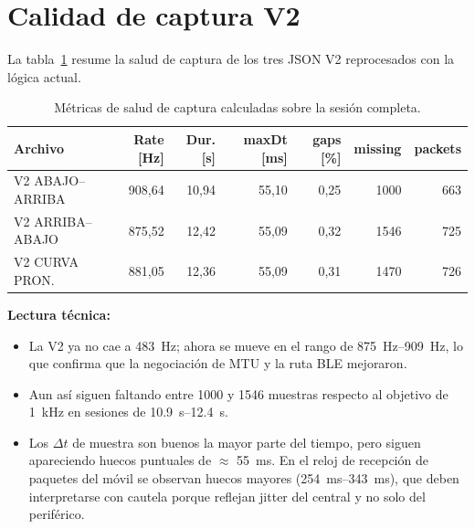 ﻿\documentclass[11pt,a4paper]{article}
\begin{document}
\section{Calidad de captura V2}
La tabla~\ref{tab:capture} resume la salud de captura de los tres JSON V2 reprocesados con la l\'ogica actual.

\begin{table}[h!]
\centering
\small
\begin{tabularx}{\textwidth}{lrrrrrr}
\toprule
Archivo & Rate [Hz] & Dur. [s] & maxDt [ms] & gaps [\%] & missing & packets \\
\midrule
V2 ABAJO--ARRIBA & 908,64 & 10,94 & 55,10 & 0,25 & 1000 & 663 \\
V2 ARRIBA--ABAJO & 875,52 & 12,42 & 55,09 & 0,32 & 1546 & 725 \\
V2 CURVA PRON. & 881,05 & 12,36 & 55,09 & 0,31 & 1470 & 726 \\
\bottomrule
\end{tabularx}
\caption{M\'etricas de salud de captura calculadas sobre la sesi\'on completa.}
\label{tab:capture}
\end{table}

\textbf{Lectura t\'ecnica:}
\begin{itemize}[leftmargin=14pt]
  \item La V2 ya no cae a \SI{483}{Hz}; ahora se mueve en el rango de \SIrange{875}{909}{Hz}, lo que confirma que la negociaci\'on de MTU y la ruta BLE mejoraron.
  \item Aun as\'i siguen faltando entre 1000 y 1546 muestras respecto al objetivo de \SI{1}{kHz} en sesiones de \SIrange{10,9}{12,4}{s}.
  \item Los \(\Delta t\) de muestra son buenos la mayor parte del tiempo, pero siguen apareciendo huecos puntuales de \(\approx\) \SI{55}{ms}. En el reloj de recepci\'on de paquetes del m\'ovil se observan huecos mayores (\SIrange{254}{343}{ms}), que deben interpretarse con cautela porque reflejan jitter del central y no solo del perif\'erico.
\end{itemize}
\end{document}
